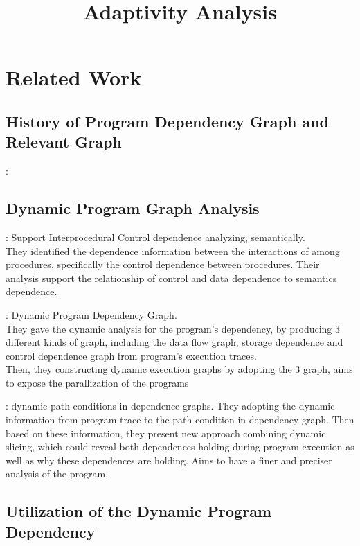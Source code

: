 \documentclass[a4paper,11pt]{article}
\begin{document}
\title{Adaptivity Analysis}

\author{}

\date{}

\maketitle

\section{Related Work}


\subsection{History of Program Dependency Graph and Relevant Graph}
\cite{baxter1989program}: 


\subsection{Dynamic Program Graph Analysis}

\cite{sinha2001interprocedural}: 
Support Interprocedural Control dependence analyzing, semantically.
\\
They identified the dependence information between the interactions of among procedures, specifically the control dependence between procedures.
Their analysis support the relationship of control and data dependence to semantics dependence.

\cite{austin1992dynamic}: Dynamic Program Dependency Graph.
\\
They gave the dynamic analysis for the program's dependency, by producing 3 different kinds of graph, 
including the data flow graph, storage dependence and control dependence graph from program's execution traces. 
\\
Then, they constructing dynamic execution graphs by adopting the 3 graph, aims to expose the parallization of the programs

\cite{hammer2006dynamic}: dynamic path conditions in dependence graphs.
They adopting the dynamic information from program trace to the path condition in dependency graph. Then based on these information, 
they present new approach combining dynamic slicing, which could reveal both dependences holding during program execution as well as why these dependences are holding. 
Aims to have a finer and preciser analysis of the program.

\subsection{Utilization of the Dynamic Program Dependency}
\end{document}
